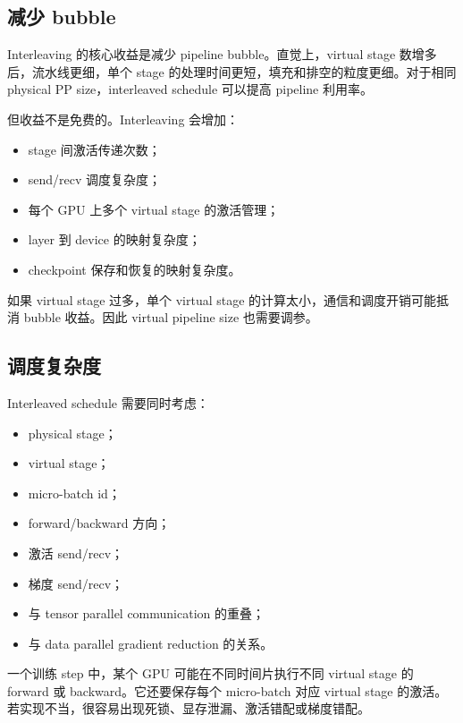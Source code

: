 \subsection{减少 bubble}
\label{subsec:interleaved-reduce-bubble}

Interleaving 的核心收益是减少 pipeline bubble。直觉上，virtual stage 数增多后，流水线更细，单个 stage 的处理时间更短，填充和排空的粒度更细。对于相同 physical PP size，interleaved schedule 可以提高 pipeline 利用率。

但收益不是免费的。Interleaving 会增加：

\begin{itemize}
\item stage 间激活传递次数；
\item send/recv 调度复杂度；
\item 每个 GPU 上多个 virtual stage 的激活管理；
\item layer 到 device 的映射复杂度；
\item checkpoint 保存和恢复的映射复杂度。
\end{itemize}

如果 virtual stage 过多，单个 virtual stage 的计算太小，通信和调度开销可能抵消 bubble 收益。因此 virtual pipeline size 也需要调参。

\subsection{调度复杂度}
\label{subsec:interleaved-scheduling-complexity}

Interleaved schedule 需要同时考虑：

\begin{itemize}
\item physical stage；
\item virtual stage；
\item micro-batch id；
\item forward/backward 方向；
\item 激活 send/recv；
\item 梯度 send/recv；
\item 与 tensor parallel communication 的重叠；
\item 与 data parallel gradient reduction 的关系。
\end{itemize}

一个训练 step 中，某个 GPU 可能在不同时间片执行不同 virtual stage 的 forward 或 backward。它还要保存每个 micro-batch 对应 virtual stage 的激活。若实现不当，很容易出现死锁、显存泄漏、激活错配或梯度错配。

